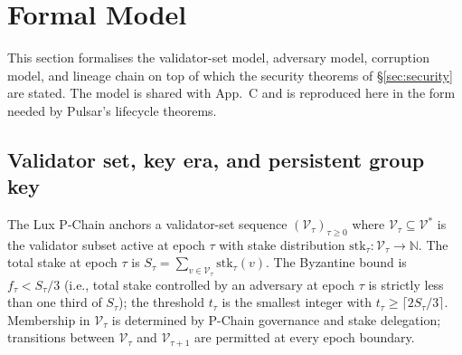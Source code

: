 

\section{Formal Model}
\label{sec:formal-model}

This section formalises the validator-set model, adversary model,
corruption model, and lineage chain on top of which the security
theorems of \S\ref{sec:security} are stated. The model is shared with
\cite{quasarcertsoundness} App.~C and is reproduced here in the form
needed by Pulsar's lifecycle theorems.

\subsection{Validator set, key era, and persistent group key}
\label{sec:formal-model:validators}

\begin{definition}
\label{def:val-tau}
The Lux P-Chain anchors a validator-set sequence
$(\mathcal{V}_\tau)_{\tau \geq 0}$ where $\mathcal{V}_\tau \subseteq
\mathcal{V}^*$ is the validator subset active at epoch $\tau$ with
stake distribution $\mathrm{stk}_\tau: \mathcal{V}_\tau \to \mathbb{N}$.
The total stake at epoch $\tau$ is
$S_\tau = \sum_{v \in \mathcal{V}_\tau} \mathrm{stk}_\tau(v)$. The
Byzantine bound is $f_\tau < S_\tau / 3$ (i.e., total stake controlled
by an adversary at epoch $\tau$ is strictly less than one third of
$S_\tau$); the threshold $t_\tau$ is the smallest integer with
$t_\tau \geq \lceil 2 S_\tau / 3 \rceil$. Membership in
$\mathcal{V}_\tau$ is determined by P-Chain governance and stake
delegation; transitions between $\mathcal{V}_\tau$ and
$\mathcal{V}_{\tau+1}$ are permitted at every epoch boundary.
\end{definition}

